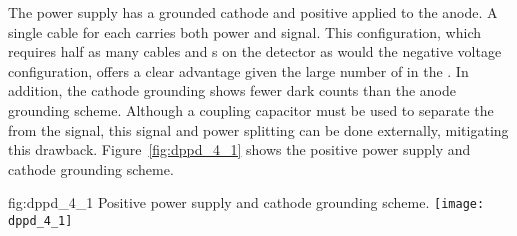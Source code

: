 The   power supply has a grounded cathode and positive  applied to the anode. A single cable for each  carries both power and signal. This configuration, which requires half as many cables and \fdth{}s on the detector as would the negative voltage configuration, offers a clear advantage given the large number of  in the . In addition, the cathode grounding shows fewer dark counts than the anode grounding scheme. Although a coupling capacitor must be used to separate the  from the  signal, this signal and power splitting can be done externally, mitigating this drawback.  Figure~\ref{fig:dppd_4_1} shows the positive power supply and cathode grounding scheme.

\begin{dunefigure}{fig:dppd_4_1}
{Positive power supply and cathode grounding scheme.}
\texttt{[image: dppd\_4\_1]}
\end{dunefigure}

